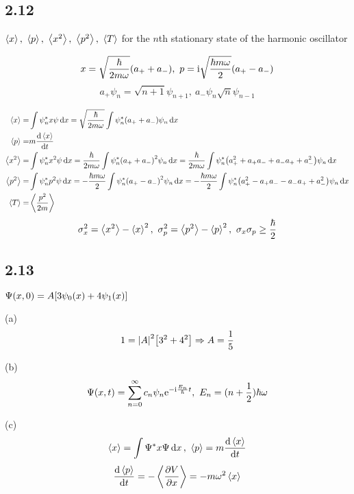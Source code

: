 \subsection{2.12}
$\expval{x},\ \expval{p},\ \expval{x^2},\ \expval{p^2},\ \expval{T}$ for the $n$th stationary state of the harmonic oscillator
\begin{framed}
    \[
    x = \sqrt{\frac{\hbar}{2 m \omega}} \qty(a_+ + a_-),\ 
    p = \rmi \sqrt{\frac{\hbar m \omega}{2}} \qty(a_+ - a_-)
    \] \[
    a_+ \psi_n = \sqrt{n + 1} \psi_{n + 1},\ a_- \psi_n \sqrt{n} \psi_{n - 1}
    \]

    \begin{align*}
        \expval{x} = & \int \psi_n^* x \psi \dd{x} = \sqrt{\frac{\hbar}{2 m \omega}} \int \psi_n^* \qty(a_+ + a_-) \psi_n \dd{x}\\
        \expval{p} = & m \dv{\expval{x}}{t}\\
        \expval{x^2} = & \int \psi_n^* x^2 \psi \dd{x} = \frac{\hbar}{2 m \omega} \int \psi_n^* \qty(a_+ + a_-)^2 \psi_n \dd{x} = \frac{\hbar}{2 m \omega} \int \psi_n^* \qty(a_+^2 + a_+ a_- + a_- a_+ +a_-^2) \psi_n \dd{x}\\
        \expval{p^2} = & \int \psi_n^* p^2 \psi \dd{x} = - \frac{\hbar m \omega}{2} \int \psi_n^* \qty(a_+ - a_-)^2 \psi_n \dd{x} = - \frac{\hbar m \omega}{2} \int \psi_n^* \qty(a_+^2 - a_+ a_- - a_- a_+ +a_-^2) \psi_n \dd{x}\\
        \expval{T} = & \expval{\frac{p^2}{2 m}}
    \end{align*} \[
    \sigma_x^2 = \expval{x^2} - \expval{x}^2,\ \sigma_p^2 = \expval{p^2} - \expval{p}^2,\ \sigma_x \sigma_p \geq \frac{\hbar}{2}
    \]
\end{framed}

\subsection{2.13}
$\Psi(x, 0) = A \qty[3 \psi_0(x) + 4 \psi_1(x)]$
\begin{framed}
    (a)
    \[
    1 = \qty|A|^2 \qty[3^2 + 4^2] \Rightarrow A = \frac{1}{5}
    \]
    
    (b)
    \[
    \Psi(x, t) = \sum_{n = 0}^{\infty} c_n \psi_n \mathrm{e}^{- \mathrm{i} \frac{E_n}{\hbar} t},\ E_n = (n + \frac{1}{2}) \hbar \omega
    \]
    
    (c)
    \[
    \expval{x} = \int \Psi^* x \Psi \dd{x},\ \expval{p} = m \dv{\expval{x}}{t}
    \] \[
    \dv{\expval{p}}{t} = - \expval{\pdv{V}{x}} = - m \omega^2 \expval{x}
    \]
\end{framed}

